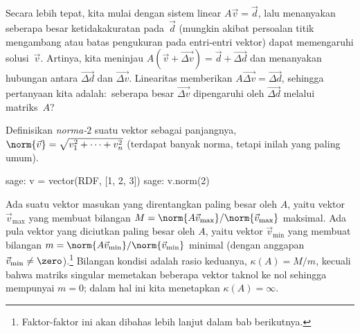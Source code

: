 Secara lebih tepat, kita mulai dengan sistem linear
$A\vec{v}=\vec{d}$,
lalu menanyakan seberapa besar ketidakakuratan pada~$\vec{d}$ (mungkin akibat
persoalan titik mengambang atau batas pengukuran pada entri-entri vektor)
dapat memengaruhi solusi~$\vec{v}$.
Artinya, kita meninjau
$A(\vec{v}+\vec{\Delta v})=\vec{d}+\vec{\Delta d}$
dan menanyakan hubungan antara $\vec{\Delta d}$ dan $\vec{\Delta v}$.
Linearitas memberikan $A\vec{\Delta v}=\vec{\Delta d}$, sehingga pertanyaan kita
adalah:~seberapa besar $\vec{\Delta v}$ dipengaruhi oleh $\vec{\Delta d}$
melalui matriks~$A$?

Definisikan \textit{norma-$2$} suatu vektor sebagai panjangnya,
  $\norm{\vec{v}}=\sqrt{v_1^2+\cdots+v_n^2}$
(terdapat banyak norma, tetapi inilah yang paling umum).
\begin{sagecommandline}
sage: v = vector(RDF, [1, 2, 3])
sage: v.norm(2)
\end{sagecommandline}
Ada suatu vektor masukan yang direntangkan paling besar oleh $A$, yaitu
vektor $\vec{v}_{\text{max}}$ yang membuat bilangan
$M=\norm{A\vec{v}_{\text{max}}}/\norm{\vec{v}_{\text{max}}}$
maksimal.
Ada pula vektor yang diciutkan paling besar oleh $A$, yaitu
vektor $\vec{v}_{\text{min}}$ yang membuat bilangan
$m=\norm{A\vec{v}_{\text{min}}}/\norm{\vec{v}_{\text{min}}}$ minimal
(dengan anggapan $\vec{v}_{\text{min}}\neq\zero$).\footnote{%
  Faktor-faktor ini akan dibahas lebih lanjut dalam bab berikutnya.}
Bilangan kondisi adalah rasio keduanya,
$\kappa(A)=M/m$, kecuali bahwa matriks singular memetakan beberapa vektor
taknol ke nol sehingga mempunyai $m=0$; dalam hal ini kita menetapkan
$\kappa(A)=\infty$.


